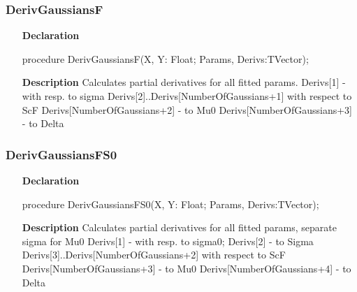 \documentclass[12pt,a4paper,oneside]{report}
\newcommand{\declarationitem}[1]{\textbf{#1}}
\newcommand{\descriptiontitle}[1]{\textbf{#1}}
\begin{document}
\subsubsection{DerivGaussiansF}
\label{ugaussf-DerivGaussiansF}
\begin{itemize}\item[\declarationitem{Declaration}\hfill]
	\begin{flushleft}
		\begin{ttfamily}
			procedure DerivGaussiansF(X, Y: Float; Params, Derivs:TVector);\end{ttfamily}
		
	\end{flushleft}
	
	\par
	\item[\descriptiontitle{Description}]
	Calculates partial derivatives for all fitted params. Derivs[1] {-} with resp. to sigma Derivs[2]..Derivs[NumberOfGaussians+1] with respect to ScF Derivs[NumberOfGaussians+2] {-} to Mu0 Derivs[NumberOfGaussians+3] {-} to Delta
	
\end{itemize}
\subsubsection{DerivGaussiansFS0}
\label{ugaussf-DerivGaussiansFS0}
\begin{itemize}\item[\declarationitem{Declaration}\hfill]
	\begin{flushleft}
		\begin{ttfamily}
			procedure DerivGaussiansFS0(X, Y: Float; Params, Derivs:TVector);\end{ttfamily}
		
	\end{flushleft}
	
	\par
	\item[\descriptiontitle{Description}]
	Calculates partial derivatives for all fitted params, separate sigma for Mu0 Derivs[1] {-} with resp. to sigma0; Derivs[2] {-} to Sigma Derivs[3]..Derivs[NumberOfGaussians+2] with respect to ScF Derivs[NumberOfGaussians+3] {-} to Mu0 Derivs[NumberOfGaussians+4] {-} to Delta
	
\end{itemize}
\end{document}
